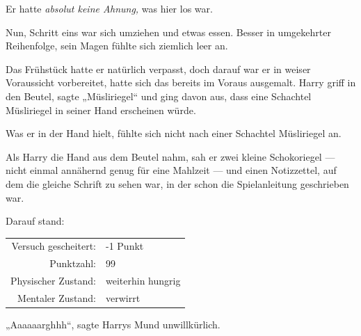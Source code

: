 Er hatte \emph{absolut keine Ahnung,} was hier los war.

Nun, Schritt eins war sich umziehen und etwas essen. Besser in umgekehrter Reihenfolge, sein Magen fühlte sich ziemlich leer an.

Das Frühstück hatte er natürlich verpasst, doch darauf war er in weiser Voraussicht vorbereitet, hatte sich das bereits im Voraus ausgemalt. Harry griff in den Beutel, sagte
„Müsliriegel“ und ging davon aus, dass eine Schachtel Müsliriegel in seiner Hand erscheinen würde.

Was er in der Hand hielt, fühlte sich nicht nach einer Schachtel Müsliriegel an.

Als Harry die Hand aus dem Beutel nahm, sah er zwei kleine Schokoriegel — nicht einmal annähernd genug für eine Mahlzeit — und einen Notizzettel, auf dem die gleiche Schrift zu sehen war, in der schon die Spielanleitung geschrieben war.

Darauf stand:
\begin{writtenNote}
\begin{tabular}{rl}
Versuch gescheitert: & -1 Punkt\\
Punktzahl: & 99\\
Physischer Zustand: & weiterhin hungrig\\
Mentaler Zustand: & verwirrt
\end{tabular}
\end{writtenNote}

„Aaaaaarghhh“, sagte Harrys Mund unwillkürlich.

